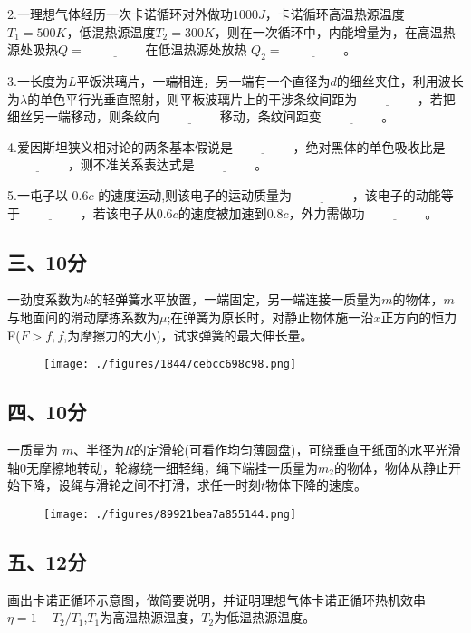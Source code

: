 2.一理想气体经历一次卡诺循环对外做功$1000J$，卡诺循环高温热源温度$T_1=500K$，低混热源温度$T_2=300K$，则在一次循环中，内能增量为，在高温热源处吸热$Q=\underline{\hspace{2cm}}$在低温热源处放热 $Q_2=\underline{\hspace{2cm}}$。

3.一长度为$L$平饭洪璃片，一端相连，另一端有一个直径为$d$的细丝夹住，利用波长为$\lambda$的单色平行光垂直照射，则平板波璃片上的干涉条纹间距为$\underline{\hspace{2cm}}$，若把细丝另一端移动，则条纹向$\underline{\hspace{2cm}}$移动，条纹间距变$\underline{\hspace{2cm}}$。

4.爱因斯坦狭义相对论的两条基本假说是$\underline{\hspace{2cm}}$，绝对黑体的单色吸收比是$\underline{\hspace{2cm}}$，测不准关系表达式是$\underline{\hspace{2cm}}$。

5.一屯子以 $0.6c$ 的速度运动,则该电子的运动质量为$\underline{\hspace{2cm}}$，该电子的动能等于$\underline{\hspace{2cm}}$，若该电子从$0.6c$的速度被加速到$0.8c$，外力需做功$\underline{\hspace{2cm}}$。
\subsection{三、10分}
一劲度系数为$k$的轻弹簧水平放置，一端固定，另一端连接一质量为$m$的物体，$m$ 与地面间的滑动摩拣系数为$\mu$;在弹簧为原长时，对静止物体施一沿$x$正方向的恒力F($F>f,f$,为摩擦力的大小)，试求弹簧的最大伸长量。
\begin{figure}[ht]
\centering
\texttt{[image: ./figures/18447cebcc698c98.png]}
\caption{} \label{fig_NJU_2}
\end{figure}
\subsection{四、10分}
一质量为 $m$、半径为$R$的定滑轮(可看作均匀薄圆盘)，可绕垂直于纸面的水平光滑轴0无摩擦地转动，轮緣绕一细轻绳，绳下端挂一质量为$m_2$的物体，物体从静止开始下降，设绳与滑轮之间不打滑，求任一时刻$t$物体下降的速度。
\begin{figure}[ht]
\centering
\texttt{[image: ./figures/89921bea7a855144.png]}
\caption{} \label{fig_NJU_3}
\end{figure}
\subsection{五、12分}
画出卡诺正循环示意图，做简要说明，并证明理想气体卡诺正循环热机效串$\eta=1-T_2/T_1$,$T_1$为高温热源温度，$T_2$为低温热源温度。